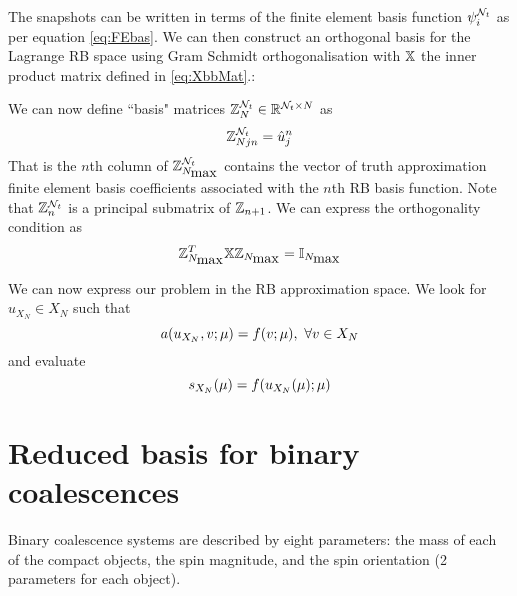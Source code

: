 The snapshots can be written in terms of the finite element basis function $\psi^{\mathcal{N}_t}_i$ as per equation \ref{eq:FEbas}. We can then construct an orthogonal basis for the Lagrange RB space using Gram Schmidt orthogonalisation with $\mathbb{X}$ the inner product matrix defined in \ref{eq:XbbMat}.:

We can now define ``basis" matrices $\mathbb{Z}^{\mathcal{N}_t}_N \in \mathbb{R} ^{\mathcal{N}_t \times N}$ as 
\begin{equation}
\mathbb{Z}^{\mathcal{N}_t}_{N j n}=\hat{u}^n_j
\end{equation}
That is the $n$th column of $\mathbb{Z}^{\mathcal{N}_t}_{N_{\mbox{max}}}$ contains the vector of truth approximation finite element basis coefficients associated with the $n$th RB basis function. Note that $\mathbb{Z}^{\mathcal{N}_t}_n$ is a principal submatrix of $\mathbb{Z}_{n+1}$. We can express the orthogonality condition as 
\begin{equation}
\mathbb{Z}^T_{N_{\mbox{max}}} \mathbb{X} \mathbb{Z}_{N_{\mbox{max}}}=\mathbb{I}_{N_{\mbox{max}}}
\end{equation}

We can now express our problem in the RB approximation space. We look for $u_{X_N} \in X_N$ such that 
\begin{equation}
a(u_{X_N},v;{\mathbf{\mu}})=f(v;{\mathbf{\mu}}), \mbox{  } \forall v \in X_N
\end{equation}
and evaluate 
\begin{equation}
s_{X_N}({\mathbf{\mu}})=f(u_{X_N}({\mathbf{\mu}});{\mathbf{\mu}})
\end{equation}



\section{Reduced basis for binary coalescences}
Binary coalescence systems are described by eight parameters: the mass of each of the compact objects, the spin magnitude, and the spin orientation (2 parameters for each object).

